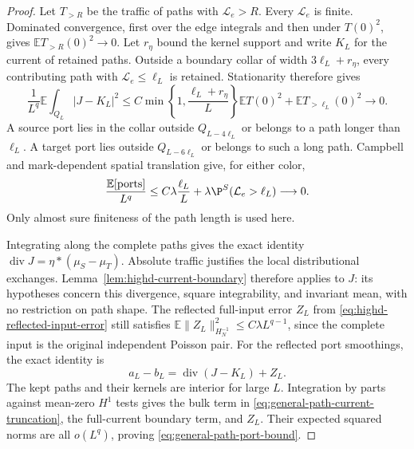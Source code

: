 \documentclass[11pt,reqno]{amsart}
\theoremstyle{definition}
\theoremstyle{remark}
\numberwithin{equation}{section}
\newcommand{\E}{\mathbb E}
\begin{document}
\begin{proof}
Let $T_{>R}$ be the traffic of paths with $\mathcal L_e>R$.
Every $\mathcal L_e$ is finite. Dominated convergence, first over the
edge integrals and then under $T(0)^2$, gives
$\E T_{>R}(0)^2\to0$. Let $r_\eta$ bound the kernel support and write
$K_L$ for the current of retained paths. Outside a boundary collar of
width $3\ell_L+r_\eta$, every contributing path with
$\mathcal L_e\le\ell_L$ is retained. Stationarity therefore gives
\begin{equation}
 \frac1{L^q}\E\int_{Q_L}|J-K_L|^2
 \le C\min\left\{1,\frac{\ell_L+r_\eta}{L}\right\}\E T(0)^2
                   +\E T_{>\ell_L}(0)^2\longrightarrow0.
 \label{eq:general-path-current-truncation}
\end{equation}
A source port lies in the collar outside $Q_{L-4\ell_L}$ or belongs
to a path longer than $\ell_L$. A target port lies outside
$Q_{L-6\ell_L}$ or belongs to such a long path. Campbell and
mark-dependent spatial translation give, for either color,
\[
 \frac{\E[\text{ports}]}{L^q}
 \le C\lambda\frac{\ell_L}{L}
       +\lambda\P^S(\mathcal L_e>\ell_L)\longrightarrow0.
\]
Only almost sure finiteness of the path length is used here.

Integrating along the complete paths gives the exact identity
$\operatorname{div}J=\eta*(\mu_S-\mu_T)$.
Absolute traffic justifies the local distributional exchanges.
Lemma~\ref{lem:highd-current-boundary} therefore applies to $J$: its
hypotheses concern this divergence, square integrability, and invariant
mean, with no restriction on path shape. The reflected full-input error
$Z_L$ from \eqref{eq:highd-reflected-input-error} still satisfies
$\E\|Z_L\|_{H_N^{-1}}^2\le C\lambda L^{q-1}$, since the complete input
is the original independent Poisson pair. For the reflected port
smoothings, the exact identity is
\[
 a_L-b_L=\operatorname{div}(J-K_L)+Z_L.
\]
The kept paths and their kernels are interior for large $L$.
Integration by parts against mean-zero $H^1$ tests gives the bulk
term in \eqref{eq:general-path-current-truncation}, the full-current
boundary term, and $Z_L$. Their expected squared norms are all
$o(L^q)$, proving \eqref{eq:general-path-port-bound}.


\end{proof}
\end{document}
